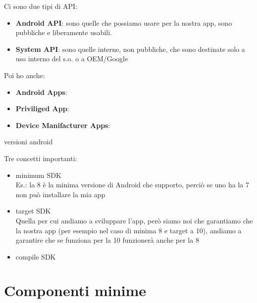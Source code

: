 \par Ci sono due tipi di API:
\begin{itemize}
    \item \textbf{Android API}: sono quelle che possiamo usare per la nostra app, sono pubbliche e liberamente usabili.
    \item \textbf{System API}: sono quelle interne, non pubbliche, che sono destinate solo a uso interno del s.o. o a OEM/Google
\end{itemize}
\par Poi ho anche:
\begin{itemize}
    \item \textbf{Android Apps}: 
    \item \textbf{Priviliged App}: 
    \item \textbf{Device Manifacturer Apps}: 
\end{itemize}

versioni android

Tre concetti importanti:
\begin{itemize}
    \item minimum SDK\\
    Es.: la 8 è la minima versione di Android che supporto, perciò se uno ha la 7 non può installare la mia app
    \item target SDK\\
    Quella per cui andiamo a sviluppare l'app, però siamo noi che garantiamo che la nostra app (per esempio nel caso di minima 8 e target a 10), andiamo a garantire che se funziona per la 10 funzionerà anche per la 8
    \item compile SDK
\end{itemize}

\section{Componenti minime}
